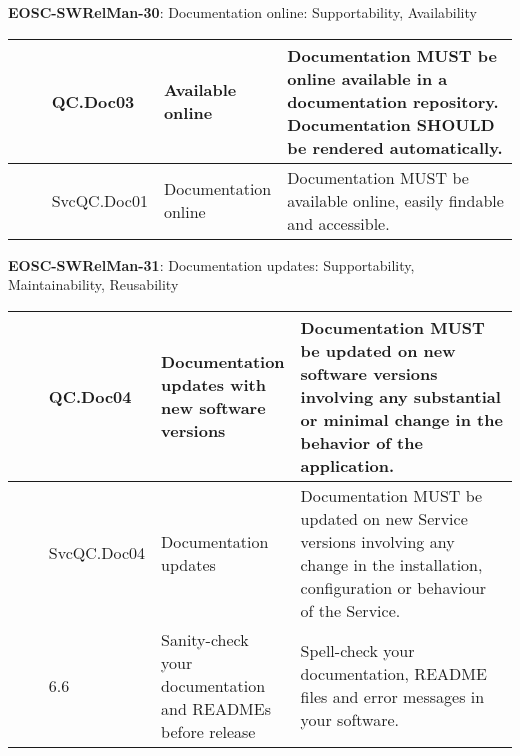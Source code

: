 \textbf{EOSC-SWRelMan-30}: Documentation online: Supportability, Availability
\nopagebreak[4]
\begin{center}
    \tabletail{\hline}
    \tiny
    \begin{supertabular}{|p{0.10\linewidth}|p{0.10\linewidth}|p{0.20\linewidth}|p{0.60\linewidth}|} \hline
        \cite{orviz_set_2017} & QC.Doc03 & Available online & Documentation MUST be online available in a documentation repository. Documentation SHOULD be rendered automatically.\\ \hline
        \cite{orviz_fernandez_eosc-synergy_2020} & SvcQC.Doc01 & Documentation online & Documentation MUST be available online, easily findable and accessible.\\ \hline
    \end{supertabular}
\end{center}

\textbf{EOSC-SWRelMan-31}: Documentation updates: Supportability, Maintainability, Reusability
\nopagebreak[4]
\begin{center}
    \tabletail{\hline}
    \tiny
    \begin{supertabular}{|p{0.10\linewidth}|p{0.10\linewidth}|p{0.20\linewidth}|p{0.60\linewidth}|} \hline
        \cite{orviz_set_2017} & QC.Doc04 & Documentation updates with new software versions & Documentation MUST be updated on new software versions involving any substantial or minimal change in the behavior of the application.\\ \hline
        \cite{orviz_fernandez_eosc-synergy_2020} & SvcQC.Doc04 & Documentation updates & Documentation MUST be updated on new Service versions involving any change in the installation, configuration or behaviour of the Service.\\ \hline
        \cite{raymond_software_2013} & 6.6 & Sanity-check your documentation and READMEs before release & Spell-check your documentation, README files and error messages in your software.\\ \hline
    \end{supertabular}
\end{center}

